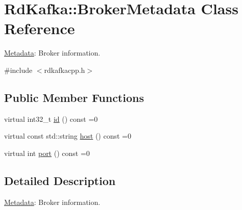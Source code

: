 \hypertarget{classRdKafka_1_1BrokerMetadata}{
\section{RdKafka::BrokerMetadata Class Reference}
\label{classRdKafka_1_1BrokerMetadata}
}


\hyperlink{classRdKafka_1_1Metadata}{Metadata}: Broker information.  


{\ttfamily \#include $<$rdkafkacpp.h$>$}\subsection*{Public Member Functions}
\begin{DoxyCompactItemize}
\item 
virtual int32\_\-t \hyperlink{classRdKafka_1_1BrokerMetadata_a710a293146153e0432f7424c47b08fe9}{id} () const =0
\item 
virtual const std::string \hyperlink{classRdKafka_1_1BrokerMetadata_a3aaa8091dc05b48eced63224ceb401fc}{host} () const =0
\item 
virtual int \hyperlink{classRdKafka_1_1BrokerMetadata_a449571140017db5fe1b71512cc645429}{port} () const =0
\end{DoxyCompactItemize}


\subsection{Detailed Description}
\hyperlink{classRdKafka_1_1Metadata}{Metadata}: Broker information. 

